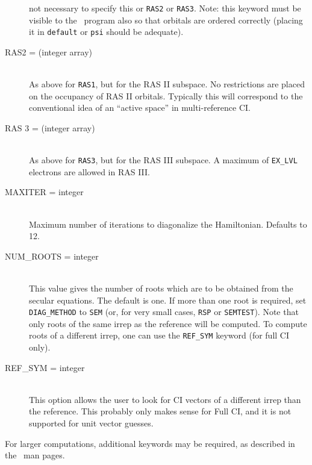 \begin{description}
not necessary to specify this or {\tt RAS2} or {\tt RAS3}.
Note: this keyword must be visible to the \PSItransqt\ program
also so that orbitals are ordered correctly (placing it in 
{\tt default} or {\tt psi} should be adequate).
\item[RAS2 = (integer array)]\mbox{}\\
As above for {\tt RAS1}, but for the RAS II subspace.  
No restrictions are placed on the occupancy of RAS II orbitals.
Typically this will correspond to the conventional idea of
an ``active space'' in multi-reference CI.
\item[RAS 3 = (integer array)]\mbox{}\\
As above for {\tt RAS3}, but for the RAS III subspace.
A maximum of {\tt EX\_LVL} electrons are allowed in RAS III.
\item[MAXITER = integer]\mbox{}\\
Maximum number of iterations to diagonalize the Hamiltonian.
Defaults to 12.
\item[NUM\_ROOTS = integer]\mbox{}\\
This value gives the number of roots which are to be obtained from
the secular equations.  The default is one.  If more than one root
is required, set {\tt DIAG\_METHOD} to {\tt SEM} (or, for very small cases,
{\tt RSP} or {\tt SEMTEST}).  Note that only roots of the same
irrep as the reference will be computed.  To compute roots of a different
irrep, one can use the {\tt REF\_SYM} keyword (for full CI only).
\item[REF\_SYM = integer]\mbox{}\\
This option allows the user to look for CI vectors of a different irrep
than the reference.  This probably only makes sense for Full CI,
and it is not supported for unit vector guesses.
\end{description}

For larger computations, additional keywords may be required, as
described in the \PSIdetci\ man pages.

